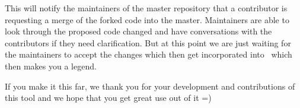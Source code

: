 This will notify the maintainers of the master repository that a contributor is requesting a merge of the forked code into the master. Maintainers are able to look through the proposed code changed and have conversations with the contributors if they need clarification. But at this point we are just waiting for the maintainers to accept the changes which then get incorporated into \CNAME\ which then makes you a legend.

If you make it this far, we thank you for your development and contributions of this tool and we hope that you get great use out of it =)


